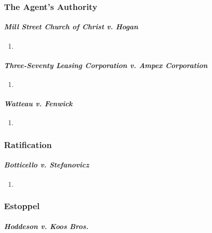 \subsubsection{The Agent's Authority}

\paragraph{\emph{Mill Street Church of Christ v. Hogan}}

\begin{enumerate}
    \item %
\end{enumerate}

\paragraph{\emph{Three-Seventy Leasing Corporation v. Ampex Corporation}}

\begin{enumerate}
    \item %
\end{enumerate}

\paragraph{\emph{Watteau v. Fenwick}}

\begin{enumerate}
    \item %
\end{enumerate}

\subsubsection{Ratification}

\paragraph{\emph{Botticello v. Stefanovicz}}

\begin{enumerate}
    \item %
\end{enumerate}

\subsubsection{Estoppel}

\paragraph{\emph{Hoddeson v. Koos Bros.}}

